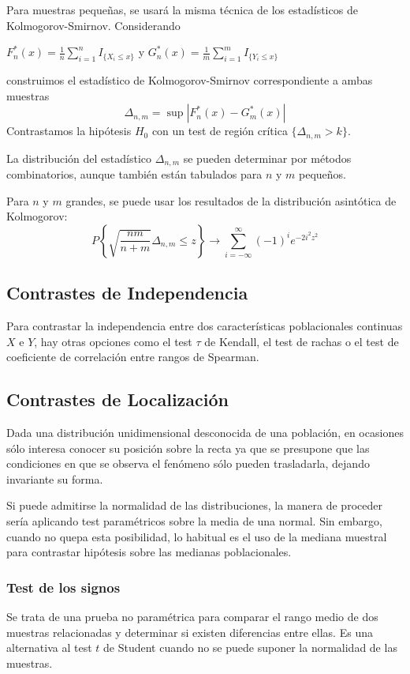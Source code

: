 \documentclass[a4paper,12pt]{article}
\begin{document}
Para muestras pequeñas, se usará la misma técnica de los estadísticos de Kolmogorov-Smirnov. Considerando
\begin{center}
$F^*_n (x)=\frac{1}{n}\sum_{i=1}^n I_{\{X_i \leq x\}}$ y $G^*_n (x)=\frac{1}{m}\sum_{i=1}^m I_{\{Y_i \leq x\}}$
\end{center}
construimos el estadístico de Kolmogorov-Smirnov correspondiente a ambas muestras $$\Delta_{n,m}=\sup|F^*_n(x)-G^*_m (x)|$$
Contrastamos la hipótesis $H_0$ con un test de región crítica $\{ \Delta_{n,m} > k\}$.

La distribución del estadístico $\Delta_{n,m}$ se pueden determinar por métodos combinatorios, aunque también están tabulados para $n$ y $m$ pequeños.

Para $n$ y $m$ grandes, se puede usar los resultados de la distribución asintótica de Kolmogorov:
$$P\left\{ \sqrt{\frac{nm}{n+m}}\Delta_{n,m}\leq z\right\}\longrightarrow \sum^{\infty}_{i=-\infty}(-1)^i e^{-2i^2z^2}$$


\subsection{Contrastes de Independencia}
Para contrastar la independencia entre dos características poblacionales continuas $X$ e $Y$, hay otras opciones como el test $\tau$ de Kendall, el test de rachas o el test de coeficiente de correlación entre rangos de Spearman.

\subsection{Contrastes de Localización}
Dada una distribución unidimensional desconocida de una población, en ocasiones sólo interesa conocer su posición sobre la recta ya que se presupone que las condiciones en que se observa el fenómeno sólo pueden trasladarla, dejando invariante su forma.

Si puede admitirse la normalidad de las distribuciones, la manera de proceder sería aplicando test paramétricos sobre la media de una normal. Sin embargo, cuando no quepa esta posibilidad, lo habitual es el uso de la mediana muestral para contrastar hipótesis sobre las medianas poblacionales.

\subsubsection{Test de los signos}
Se trata de una prueba no paramétrica para comparar el rango medio de dos muestras relacionadas y determinar si existen diferencias entre ellas. Es una alternativa al test $t$ de Student cuando no se puede suponer la normalidad de las muestras.
\end{document}
